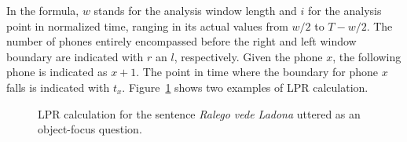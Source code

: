 In the formula, $w$ stands for the analysis window length and $i$ for the analysis point in normalized time, ranging in its actual values from $w/2$ to $T-w/2$. The number of phones entirely encompassed before the right and left window boundary are indicated with $r$ an $l$, respectively. Given the phone $x$, the following phone is indicated as $x+1$. The point in time where the boundary for phone $x$ falls is indicated with $t_{x}$. Figure~\ref{fig403} shows two examples of LPR calculation.

\begin{figure}
\centering
{}
\caption{LPR calculation for the sentence \textit{Ralego vede Ladona} uttered as an object-focus question.}
\label{fig403}\end{figure}

